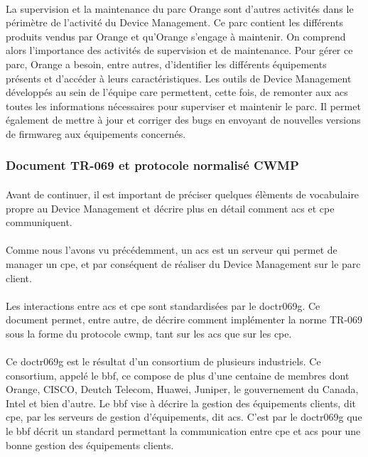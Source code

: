 \documentclass[12pt,a4paper]{report}
\begin{document}
\paragraph*{}
La supervision et la maintenance du parc Orange sont d'autres activités dans le
périmètre de l'activité du Device Management. Ce parc contient les différents produits vendus par Orange et qu’Orange s'engage à maintenir. On comprend alors l'importance des activités de supervision et de maintenance. Pour gérer ce parc, Orange a besoin, entre autres, d'identifier les différents équipements présents et d'accéder à leurs  caractéristiques. Les outils de Device Management  développés au sein de l'équipe \gls{care} permettent, cette fois, de remonter aux \gls{acs} toutes les informations nécessaires pour superviser et maintenir le parc. Il permet également de mettre à jour et corriger des bugs en envoyant de nouvelles versions de \gls{firmwareg} aux équipements concernés. \\
\subsubsection{Document TR-069 et protocole normalisé CWMP}
\paragraph*{} Avant de continuer, il est important de préciser quelques élèments de vocabulaire propre au Device Management et décrire plus en détail comment \gls{acs} et \gls{cpe} communiquent.
\paragraph*{}Comme nous l'avons vu précédemment, un \gls{acs} est un serveur qui permet de manager un \gls{cpe}, et par conséquent de réaliser du Device Management sur le parc client. 
\paragraph*{}Les interactions entre \gls{acs} et \gls{cpe} sont standardisées par le \gls{doctr069g}. Ce document permet, entre autre, de décrire comment implémenter la norme TR-069 sous la forme du protocole \gls{cwmp}, tant sur les \gls{acs} que sur les \gls{cpe}.
\paragraph*{}Ce \gls{doctr069g} est le résultat d'un consortium de plusieurs industriels. Ce consortium, appelé le \gls{bbf}, ce compose de plus d'une centaine de membres dont Orange, CISCO, Deutch Telecom, Huawei, Juniper, le gouvernement du Canada, Intel et bien d'autre. Le \gls{bbf} vise à décrire la gestion des équipements clients, dit \gls{cpe}, par les serveurs de gestion d'équipements, dit \gls{acs}. C'est par le \gls{doctr069g} que le \gls{bbf} décrit un standard permettant la communication entre \gls{cpe} et \gls{acs} pour une bonne gestion des équipements clients.
\end{document}
